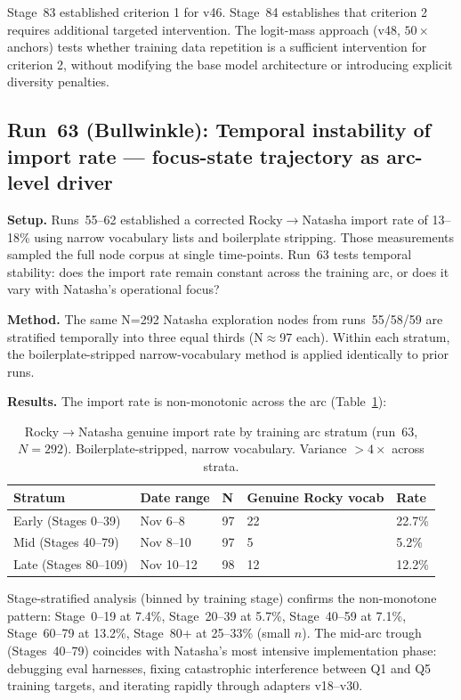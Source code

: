 \documentclass[11pt]{article}
\begin{document}
Stage~83 established criterion 1 for v46. Stage~84 establishes that criterion 2 requires
additional targeted intervention. The logit-mass approach (v48, $50\times$ anchors) tests
whether training data repetition is a sufficient intervention for criterion 2, without
modifying the base model architecture or introducing explicit diversity penalties.


\subsection{Run~63 (Bullwinkle): Temporal instability of import rate --- focus-state trajectory as arc-level driver}

\textbf{Setup.} Runs~55--62 established a corrected Rocky$\to$Natasha import rate of 13--18\% using narrow vocabulary lists and boilerplate stripping. Those measurements sampled the full node corpus at single time-points. Run~63 tests temporal stability: does the import rate remain constant across the training arc, or does it vary with Natasha's operational focus?

\textbf{Method.} The same N=292 Natasha exploration nodes from runs~55/58/59 are stratified temporally into three equal thirds (N$\approx$97 each). Within each stratum, the boilerplate-stripped narrow-vocabulary method is applied identically to prior runs.

\textbf{Results.} The import rate is non-monotonic across the arc (Table~\ref{tab:temporal-import}):

\begin{table}[h]
\centering
\begin{tabular}{lllll}
\hline
Stratum & Date range & N & Genuine Rocky vocab & Rate \\
\hline
Early (Stages 0--39) & Nov 6--8 & 97 & 22 & 22.7\% \\
Mid (Stages 40--79)  & Nov 8--10 & 97 & 5  & 5.2\%  \\
Late (Stages 80--109) & Nov 10--12 & 98 & 12 & 12.2\% \\
\hline
\end{tabular}
\caption{Rocky$\to$Natasha genuine import rate by training arc stratum (run~63, $N=292$). Boilerplate-stripped, narrow vocabulary. Variance $>4\times$ across strata.}
\label{tab:temporal-import}
\end{table}

Stage-stratified analysis (binned by training stage) confirms the non-monotone pattern: Stage~0--19 at 7.4\%, Stage~20--39 at 5.7\%, Stage~40--59 at 7.1\%, Stage~60--79 at 13.2\%, Stage~80+ at 25--33\% (small $n$). The mid-arc trough (Stages~40--79) coincides with Natasha's most intensive implementation phase: debugging eval harnesses, fixing catastrophic interference between Q1 and Q5 training targets, and iterating rapidly through adapters v18--v30.
\end{document}
